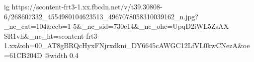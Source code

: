  
 
 
 
 

\ifcmt
  ig https://scontent-frt3-1.xx.fbcdn.net/v/t39.30808-6/268607332_4554980104623513_4967078058310039162_n.jpg?_nc_cat=104&ccb=1-5&_nc_sid=730e14&_nc_ohc=UpqD2iWL5ZsAX-SR1vh&_nc_ht=scontent-frt3-1.xx&oh=00_AT8gBRQcHyxFNjrxdkni_DY6645cAWGC12LfVL0kwCNezA&oe=61CB204D
  @width 0.4
\fi
